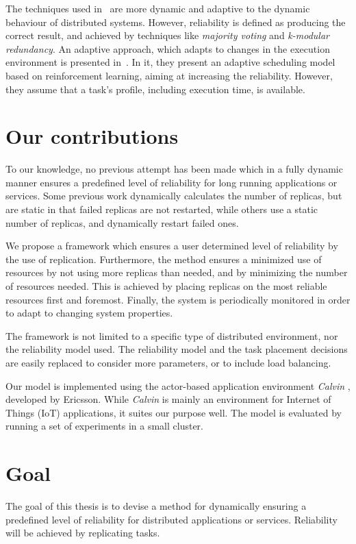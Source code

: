\documentclass{cslthse-msc}
\begin{document}
The techniques used in~\cite{selfAdaptRel, dynAdaptRepl, relModelWebServices} are more dynamic and adaptive to the dynamic behaviour of distributed systems. However, reliability is defined as producing the correct result, and achieved by techniques like \emph{majority voting} and \emph{k-modular redundancy}. An adaptive approach, which adapts to changes in the execution environment is presented in~\cite{imprRelAdaptRL}. In it, they present an adaptive scheduling model based on reinforcement learning, aiming at increasing the reliability. However, they assume that a task's profile, including execution time, is available.

\section{Our contributions} \label{sec:introduction_contributions}
To our knowledge, no previous attempt has been made which in a fully dynamic manner ensures a predefined level of reliability for long running applications or services. Some previous work dynamically calculates the number of replicas, but are static in that failed replicas are not restarted, while others use a static number of replicas, and dynamically restart failed ones.

We propose a framework which ensures a user determined level of reliability by the use of replication. Furthermore, the method ensures a minimized use of resources by not using more replicas than needed, and by minimizing the number of resources needed. This is achieved by placing replicas on the most reliable resources first and foremost. Finally, the system is periodically monitored in order to adapt to changing system properties.

The framework is not limited to a specific type of distributed environment, nor the reliability model used. The reliability model and the task placement decisions are easily replaced to consider more parameters, or to include load balancing. 

Our model is implemented using the actor-based application environment \emph{Calvin} \cite{calvin}, developed by Ericsson. While \emph{Calvin} is mainly an environment for Internet of Things (IoT) applications, it suites our purpose well. The model is evaluated by running a set of experiments in a small cluster.

\section{Goal} \label{sec:introduction_goals}
The goal of this thesis is to devise a method for dynamically ensuring a predefined level of reliability for distributed applications or services. Reliability will be achieved by replicating tasks.
\end{document}
